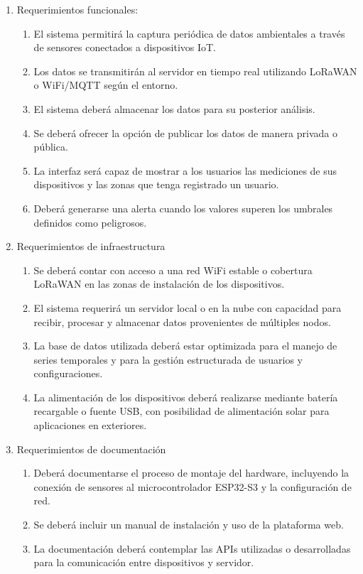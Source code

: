 \documentclass[
11pt, %
]{charter}
\begin{document}
\begin{enumerate}

	\item Requerimientos funcionales:
	\begin{enumerate}
	

		\item El sistema permitirá la captura periódica de datos ambientales a través de sensores conectados a dispositivos IoT.
		\item Los datos se transmitirán al servidor en tiempo real utilizando LoRaWAN o WiFi/MQTT según el entorno.
		\item El sistema deberá almacenar los datos para su posterior análisis.
		\item Se deberá ofrecer la opción de publicar los datos de manera privada o pública.
		\item La interfaz será capaz de mostrar a los usuarios las mediciones de sus dispositivos y las zonas que tenga registrado un usuario.
		\item Deberá generarse una alerta cuando los valores superen los umbrales definidos como peligrosos.
	\end{enumerate}
	
	\item Requerimientos de infraestructura
	\begin{enumerate}
		\item Se deberá contar con acceso a una red WiFi estable o cobertura LoRaWAN en las zonas de instalación de los dispositivos.
		\item El sistema requerirá un servidor local o en la nube con capacidad para recibir, procesar y almacenar datos provenientes de múltiples nodos.
		\item La base de datos utilizada deberá estar optimizada para el manejo de series temporales y para la gestión estructurada de usuarios y configuraciones.
		\item La alimentación de los dispositivos deberá realizarse mediante batería recargable o fuente USB, con posibilidad de alimentación solar para aplicaciones en exteriores.	
	\end{enumerate}
	
	\item Requerimientos de documentación
	\begin{enumerate}
		\item Deberá documentarse el proceso de montaje del hardware, incluyendo la conexión de sensores al microcontrolador ESP32-S3 y la configuración de red.
		\item Se deberá incluir un manual de instalación y uso de la plataforma web.
		\item La documentación deberá contemplar las APIs utilizadas o desarrolladas para la comunicación entre dispositivos y servidor.	
	\end{enumerate}


\end{enumerate}
\end{document}
